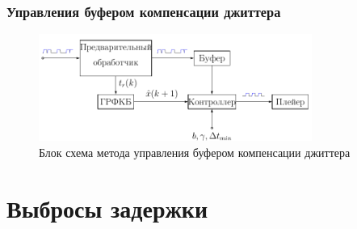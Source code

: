 \documentclass[10pt,pdf,hyperref={unicode}]{beamer}
\begin{document}
\begin{frame}
\frametitle{Управления буфером компенсации джиттера}

\begin{figure}[!h]
\centering
\includegraphics[width=1\linewidth , height=3.5cm]{manage_buffer.png}
\caption*{Блок схема метода управления буфером компенсации джиттера}
\label{fig:man_5}
\end{figure}

\end{frame}



\section{Выбросы задержки}
\end{document}
